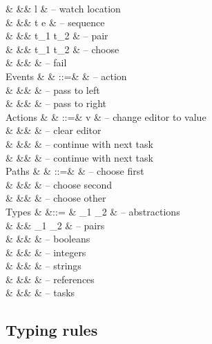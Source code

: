 \begin{grammar}
    &        &\mid& \Watch l                    & – watch location \\
    &        &\mid& t \Seq e                    & – sequence \\
    &        &\mid& t_1 \And t_2                & – pair \\
    &        &\mid& t_1 \Or t_2                 & – choose \\
    &        &\mid& \Fail                       & – fail \\
  Events
    & \eta   & ::=& \alpha                      & – action \\
    &        &\mid& \Left \eta                  & – pass to left \\
    &        &\mid& \Right \eta                 & – pass to right \\
  Actions
    & \alpha & ::=& v                           & – change editor to value \\
    &        &\mid& \Clear                      & – clear editor \\
    &        &\mid& \Pick \pi                   & – continue with next task \\
    &        &\mid& \Execute \pi                & – continue with next task \\
  Paths
    & \pi    & ::=& \First                      & – choose first \\
    &        &\mid& \Second                     & – choose second \\
    &        &\mid& \Other \pi                  & – choose other \\
  Types
    & \tau   &::= & \tau_1 \to \tau_2           & – abstractions \\
    &        &\mid& \tau_1 \times \tau_2        & – pairs \\
    &        &\mid& \Bool                       & – booleans \\
    &        &\mid& \Int                        & – integers \\
    &        &\mid& \String                     & – strings \\
    &        &\mid& \Reference \tau             & – references \\
    &        &\mid& \Task \tau                  & – tasks \\
\end{grammar}


\newpage
\subsection{Typing rules}

